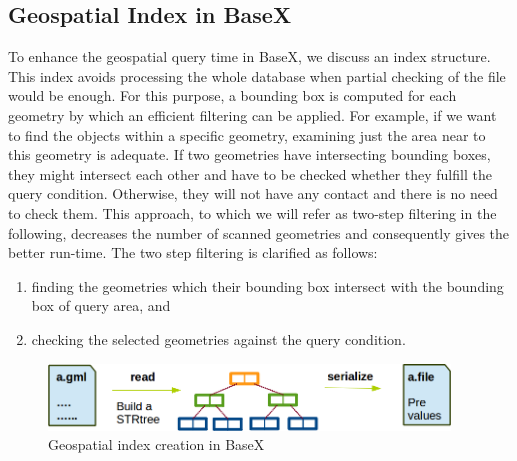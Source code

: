 \documentclass[a4paper,12pt]{article}
\begin{document}
\subsection{Geospatial Index in BaseX}
\label{indexBX}
To enhance the geospatial query time in BaseX, we discuss an index structure. This index avoids processing the whole database when partial checking of the file would be enough. For this purpose, a bounding box is computed for each geometry by which an efficient filtering can be applied. For example, if we want to find the objects within a specific geometry, examining just the area near to this geometry is adequate. If two geometries have intersecting bounding boxes, they might intersect each other and have to be checked whether they fulfill the query condition. Otherwise, they will not have any contact and there is no need to check them. This approach, to which we will refer as two-step filtering in the following, decreases the number of scanned geometries and consequently gives the better run-time. The two step filtering is clarified as follows:
\begin{enumerate}
\item finding the geometries which their bounding box intersect with the bounding box of query area, and
\item checking the selected geometries against the query condition.
\end{enumerate}


 \begin{figure}
\centering
\includegraphics[width=0.95\textwidth]{IndexinFile}
\caption{Geospatial index creation in BaseX}
\label{figIndexinFile}
\end{figure}
\end{document}
